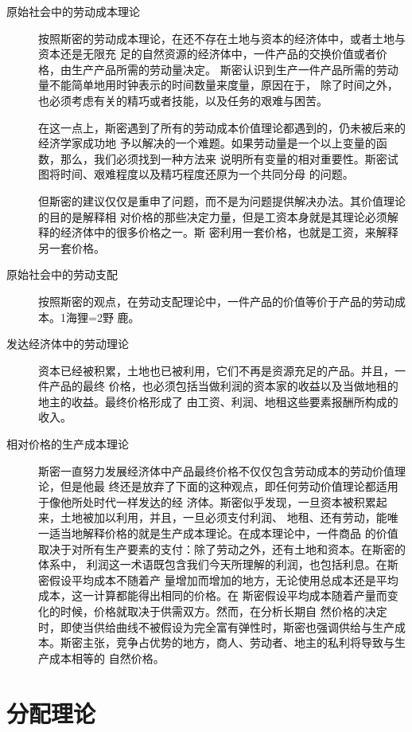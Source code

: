 \begin{description}
\item[原始社会中的劳动成本理论]

按照斯密的劳动成本理论，在还不存在土地与资本的经济体中，或者土地与资本还是无限充
足的自然资源的经济体中，一件产品的交换价值或者价格，由生产产品所需的劳动量决定。
斯密认识到生产一件产品所需的劳动量不能简单地用时钟表示的时间数量来度量，原因在于，
除了时间之外，也必须考虑有关的精巧或者技能，以及任务的艰难与困苦。

在这一点上，斯密遇到了所有的劳动成本价值理论都遇到的，仍未被后来的经济学家成功地
予以解决的一个难题。如果劳动量是一个以上变量的函数，那么，我们必须找到一种方法来
说明所有变量的相对重要性。斯密试图将时间、艰难程度以及精巧程度还原为一个共同分母
的问题。

但斯密的建议仅仅是重申了问题，而不是为问题提供解决办法。其价值理论的目的是解释相
对价格的那些决定力量，但是工资本身就是其理论必须解释的经济体中的很多价格之一。斯
密利用一套价格，也就是工资，来解释另一套价格。

\item[原始社会中的劳动支配]
按照斯密的观点，在劳动支配理论中，一件产品的价值等价于产品的劳动成本。1海狸=2野
鹿。

\item[发达经济体中的劳动理论]
  资本已经被积累，土地也已被利用，它们不再是资源充足的产品。并且，一件产品的最终
  价格，也必须包括当做利润的资本家的收益以及当做地租的地主的收益。最终价格形成了
  由工资、利润、地租这些要素报酬所构成的收入。


\item[相对价格的生产成本理论]
  斯密一直努力发展经济体中产品最终价格不仅仅包含劳动成本的劳动价值理论，但是他最
  终还是放弃了下面的这种观点，即任何劳动价值理论都适用于像他所处时代一样发达的经
  济体。斯密似乎发现，一旦资本被积累起来，土地被加以利用，并且，一旦必须支付利润、
  地租、还有劳动，能唯一适当地解释价格的就是生产成本理论。在成本理论中，一件商品
  的价值取决于对所有生产要素的支付：除了劳动之外，还有土地和资本。在斯密的体系中，
  利润这一术语既包含我们今天所理解的利润，也包括利息。在斯密假设平均成本不随着产
  量增加而增加的地方，无论使用总成本还是平均成本，这一计算都能得出相同的价格。在
  斯密假设平均成本随着产量而变化的时候，价格就取决于供需双方。然而，在分析长期自
  然价格的决定时，即使当供给曲线不被假设为完全富有弹性时，斯密也强调供给与生产成
  本。斯密主张，竞争占优势的地方，商人、劳动者、地主的私利将导致与生产成本相等的
  自然价格。
\end{description}

\section{分配理论}


